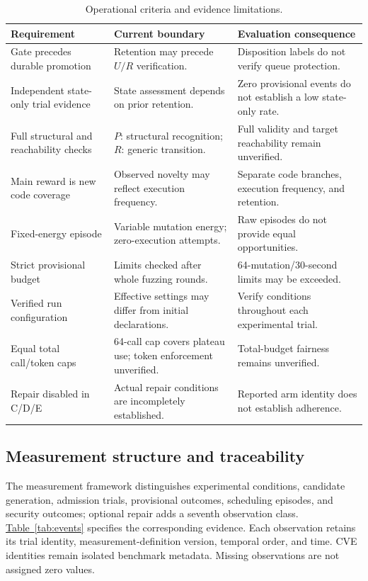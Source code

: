 \documentclass[final,5p,times,number]{elsarticle}
\newcommand{\namedref}[2]{\hyperref[#2]{#1~\ref*{#2}}}
\begin{document}
\begin{table}[!tbp]
\centering\small
\caption{Operational criteria and evidence limitations.}
\label{tab:implementation}
\begin{tabularx}{\textwidth}{Y Y Y}
\toprule
Requirement & Current boundary & Evaluation consequence \\
\midrule
Gate precedes durable promotion & Retention may precede $U/R$ verification. & Disposition labels do not verify queue protection. \\
Independent state-only trial evidence & State assessment depends on prior retention. & Zero provisional events do not establish a low state-only rate. \\
Full structural and reachability checks & $P$: structural recognition; $R$: generic transition. & Full validity and target reachability remain unverified. \\
Main reward is new code coverage & Observed novelty may reflect execution frequency. & Separate code branches, execution frequency, and retention. \\
Fixed-energy episode & Variable mutation energy; zero-execution attempts. & Raw episodes do not provide equal opportunities. \\
Strict provisional budget & Limits checked after whole fuzzing rounds. & 64-mutation/30-second limits may be exceeded. \\
Verified run configuration & Effective settings may differ from initial declarations. & Verify conditions throughout each experimental trial. \\
Equal total call/token caps & 64-call cap covers plateau use; token enforcement unverified. & Total-budget fairness remains unverified. \\
Repair disabled in C/D/E & Actual repair conditions are incompletely established. & Reported arm identity does not establish adherence. \\
\bottomrule
\end{tabularx}
\end{table}

\subsection{Measurement structure and traceability}
The measurement framework distinguishes experimental conditions, candidate generation, admission trials, provisional outcomes, scheduling episodes, and security outcomes; optional repair adds a seventh observation class. \namedref{Table}{tab:events} specifies the corresponding evidence. Each observation retains its trial identity, measurement-definition version, temporal order, and time. CVE identities remain isolated benchmark metadata. Missing observations are not assigned zero values.
\end{document}
